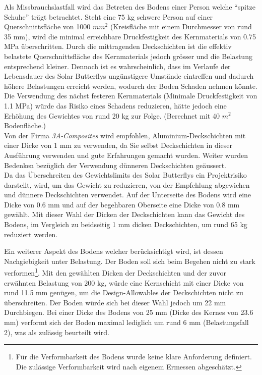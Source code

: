 Als Missbrauchslastfall wird das Betreten des Bodens einer Person welche ``spitze Schuhe'' trägt betrachtet. Steht eine 75 kg schwere Person auf einer Querschnittsfläche von 1000 $mm^2$ (Kreisfläche mit einem Durchmesser von rund 35 mm), wird die minimal erreichbare Druckfestigkeit des Kernmaterials von 0.75 MPa überschritten. Durch die mittragenden Deckschichten ist die effektiv belastete Querschnittsfläche des Kernmaterials jedoch grösser und die Belastung entsprechend kleiner. Dennoch ist es wahrscheinlich, dass im Verlaufe der Lebensdauer des Solar Butterflys ungünstigere Umstände eintreffen und dadurch höhere Belastungen erreicht werden, wodurch der Boden Schaden nehmen könnte. Die Verwendung des nächst festeren Kernmaterials (Minimale Druckfestigkeit von 1.1 MPa) würde das Risiko eines Schadens reduzieren, hätte jedoch eine Erhöhung des Gewichtes von rund 20 kg zur Folge. (Berechnet mit 40 $m^2$ Bodenfläche.)\\
Von der Firma \emph{3A-Composites} wird empfohlen, Aluminium-Deckschichten mit einer Dicke von 1 mm zu verwenden, da Sie selbst Deckschichten in dieser Ausführung verwenden und gute Erfahrungen gemacht wurden. Weiter wurden Bedenken bezüglich der Verwendung dünneren Deckschichten geäussert.\\
Da das Überschreiten des Gewichtslimits des Solar Butterflys ein Projektrisiko darstellt, wird, um das Gewicht zu reduzieren, von der Empfehlung abgewichen und dünnere Deckschichten verwendet. Auf der Unterseite des Bodens wird eine Dicke von 0.6 mm und auf der begehbaren Oberseite eine Dicke von 0.8 mm gewählt. Mit dieser Wahl der Dicken der Deckschichten kann das Gewicht des Bodens, im Vergleich zu beidseitig 1 mm dicken Deckschichten, um rund 65 kg reduziert werden.

Ein weiterer Aspekt des Bodens welcher berücksichtigt wird, ist dessen Nachgiebigkeit unter Belastung. Der Boden soll sich beim Begehen nicht zu stark verformen\footnote{Für die Verformbarkeit des Bodens wurde keine klare Anforderung definiert. Die zulässige Verformbarkeit wird nach eigenem Ermessen abgeschätzt.}.  Mit den gewählten Dicken der Deckschichten und der zuvor erwähnten Belastung von 200 kg, würde eine Kernschicht mit einer Dicke von rund 11.5 mm genügen, um die Design-Allowables der Deckschichten nicht zu überschreiten. Der Boden würde sich bei dieser Wahl jedoch um 22 mm Durchbiegen. Bei einer Dicke des Bodens von 25 mm (Dicke des Kernes von 23.6 mm) verformt sich der Boden maximal lediglich um rund 6 mm (Belastungsfall 2), was als zulässig beurteilt wird.

